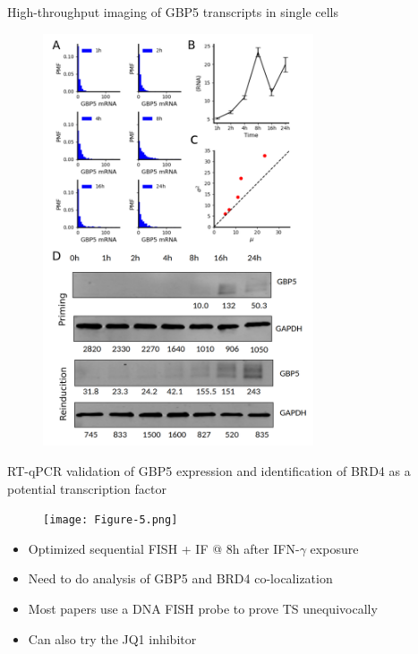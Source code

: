 \documentclass{beamer}					%
\begin{document}
\begin{frame}{High-throughput imaging of GBP5 transcripts in single cells}
\begin{figure}
\includegraphics[width=8cm]{Figure-3.png}
\end{figure}
\end{frame}

\begin{frame}{RT-qPCR validation of GBP5 expression and identification of BRD4 as a potential transcription factor}
\begin{figure}
\texttt{[image: Figure-5.png]}
\end{figure}
\begin{itemize}
\item Optimized sequential FISH + IF @ 8h after IFN-$\gamma$ exposure
\item Need to do analysis of GBP5 and BRD4 co-localization
\item Most papers use a DNA FISH probe to prove TS unequivocally
\item Can also try the JQ1 inhibitor
\end{itemize}

\end{frame}
\end{document}
